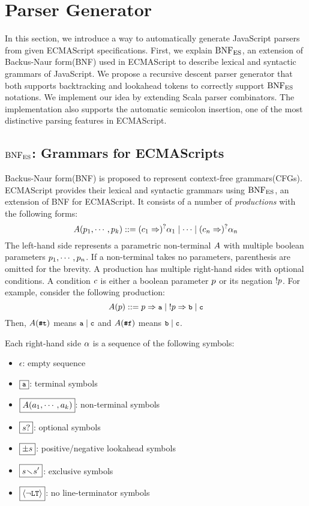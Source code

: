 \section{Parser Generator}\label{sec:parser}

In this section, we introduce a way to automatically generate JavaScript parsers
from given ECMAScript specifications. First, we explain \( \text{BNF}_{\text{ES}} \), an extension
of Backus-Naur form(BNF) used in ECMAScript to describe lexical and
syntactic grammars of JavaScript. We propose a recursive descent parser generator
that both supports backtracking and lookahead tokens to correctly support
\( \text{BNF}_{\text{ES}} \) notations. We implement our idea by extending Scala parser combinators.
The implementation also supports the automatic semicolon insertion,
one of the most distinctive parsing features in ECMAScript.

\subsection{\( \text{BNF}_{\text{ES}} \): Grammars for ECMAScripts}

Backus-Naur form(BNF) is proposed to represent context-free grammars(CFGs).
ECMAScript provides their lexical and syntactic grammars using \( \text{BNF}_{\text{ES}} \),
an extension of BNF for ECMAScript.
It consists of a number of \textit{productions} with the following forms:
\[
  A(p_1, \cdots, p_k) ::=
  (c_1 \Rightarrow)^? \alpha_1 \mid
  \cdots \mid
  (c_n \Rightarrow)^? \alpha_n
\]
The left-hand side represents a parametric non-terminal \( A \) with
multiple boolean parameters \( p_1, \cdots, p_n \).
If a non-terminal takes no parameters, parenthesis are omitted for the brevity.
A production has multiple right-hand sides with optional conditions.
A condition \( c \) is either a boolean parameter \( p \)
or its negation \( ! p \).
For example, consider the following production:
\[
  A(p) ::= p \Rightarrow \texttt{\small a}
  \mid \; !p \Rightarrow \texttt{\small b}
  \mid  \texttt{\small c}
\]
Then, \( A(\texttt{\small\#t}) \) means \( \texttt{\small a} \mid \texttt{\small c} \)
and \( A(\texttt{\small\#f}) \) means \( \texttt{\small b} \mid \texttt{\small c} \).

Each right-hand side \( \alpha \) is a sequence of the following symbols:
\begin{itemize}
  \item \( \boxed{\epsilon} \): empty sequence
  \item \( \boxed{\texttt{\small a}} \): terminal symbols
  \item \( \boxed{A(a_1, \cdots, a_k)} \): non-terminal symbols
  \item \( \boxed{s?} \): optional symbols
  \item \( \boxed{\pm s} \): positive/negative lookahead symbols
  \item \( \boxed{s \!\smallsetminus\! s'} \): exclusive symbols
  \item \( \boxed{\left<\neg\texttt{\small LT}\right>} \): no line-terminator symbols
\end{itemize}

